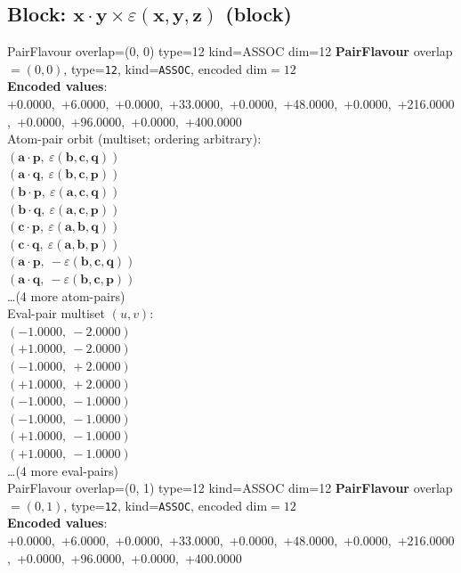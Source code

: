 \documentclass[a4paper,11pt]{article}
\newcommand{\pdcegfomjfhook}[2]{\mathbf{#1} \cdot \mathbf{#2}}
\newcommand{\kblbmcpggoncpf}[3]{\varepsilon(\mathbf{#1},\mathbf{#2},\mathbf{#3})}
\begin{document}
\subsection{Block: $\pdcegfomjfhook{x}{y} \times \kblbmcpggoncpf{x}{y}{z}$  (block)}
    PairFlavour  overlap=(0, 0)  type=12  kind=ASSOC  dim=12
\textbf{PairFlavour} overlap$=(0, 0)$, type=\texttt{12}, kind=\texttt{ASSOC}, encoded dim$=12$\\
\textbf{      Encoded values}: +0.0000,\ +6.0000,\ +0.0000,\ +33.0000,\ +0.0000,\ +48.0000,\ +0.0000,\ +216.0000,\ +0.0000,\ +96.0000,\ +0.0000,\ +400.0000\\
\quad Atom-pair orbit (multiset; ordering arbitrary):\\
$(\pdcegfomjfhook{a}{p},\ \kblbmcpggoncpf{b}{c}{q})$\\
$(\pdcegfomjfhook{a}{q},\ \kblbmcpggoncpf{b}{c}{p})$\\
$(\pdcegfomjfhook{b}{p},\ \kblbmcpggoncpf{a}{c}{q})$\\
$(\pdcegfomjfhook{b}{q},\ \kblbmcpggoncpf{a}{c}{p})$\\
$(\pdcegfomjfhook{c}{p},\ \kblbmcpggoncpf{a}{b}{q})$\\
$(\pdcegfomjfhook{c}{q},\ \kblbmcpggoncpf{a}{b}{p})$\\
$(\pdcegfomjfhook{a}{p},\ -\kblbmcpggoncpf{b}{c}{q})$\\
$(\pdcegfomjfhook{a}{q},\ -\kblbmcpggoncpf{b}{c}{p})$\\
\quad \ldots (4 more atom-pairs)\\
\quad Eval-pair multiset $(u, v)$:\\
$(-1.0000,\ -2.0000)$\\
$(+1.0000,\ -2.0000)$\\
$(-1.0000,\ +2.0000)$\\
$(+1.0000,\ +2.0000)$\\
$(-1.0000,\ -1.0000)$\\
$(-1.0000,\ -1.0000)$\\
$(+1.0000,\ -1.0000)$\\
$(+1.0000,\ -1.0000)$\\
\quad \ldots (4 more eval-pairs)\\
    PairFlavour  overlap=(0, 1)  type=12  kind=ASSOC  dim=12
\textbf{PairFlavour} overlap$=(0, 1)$, type=\texttt{12}, kind=\texttt{ASSOC}, encoded dim$=12$\\
\textbf{      Encoded values}: +0.0000,\ +6.0000,\ +0.0000,\ +33.0000,\ +0.0000,\ +48.0000,\ +0.0000,\ +216.0000,\ +0.0000,\ +96.0000,\ +0.0000,\ +400.0000\\
\end{document}
